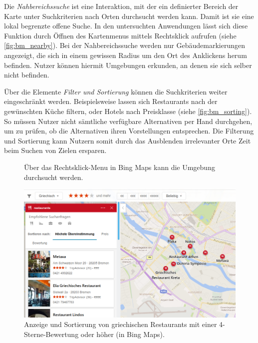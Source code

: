 Die \emph{Nahbereichssuche} ist eine Interaktion, mit der ein definierter Bereich der Karte unter Suchkriterien nach Orten durchsucht werden kann.
Damit ist sie eine lokal begrenzte offene Suche.
In den untersuchten Anwendungen lässt sich diese Funktion durch Öffnen des Kartenmenus mittels Rechtsklick aufrufen (siehe \autoref{fig:bm_nearby}).
Bei der Nahbereichssuche werden nur Gebäudemarkierungen angezeigt, die sich in einem gewissen Radius um den Ort des Anklickens herum befinden.
Nutzer können hiermit Umgebungen erkunden, an denen sie sich selber nicht befinden.

Über die Elemente \emph{Filter und Sortierung} können die Suchkriterien weiter eingeschränkt werden.
Beispielsweise lassen sich Restaurants nach der gewünschten Küche filtern, oder Hotels nach Preisklasse (siehe \autoref{fig:bm_sorting}).
So müssen Nutzer nicht sämtliche verfügbare Alternativen per Hand durchgehen, um zu prüfen, ob die Alternativen ihren Vorstellungen entsprechen.
Die Filterung und Sortierung kann Nutzern somit durch das Ausblenden irrelevanter Orte Zeit beim Suchen von Zielen ersparen.

\begin{figure}[p]
    \centering
	\caption{Über das Rechtsklick-Menu in Bing Maps kann die Umgebung durchsucht werden.}
	\label{fig:bm_nearby}
\end{figure}
\begin{figure}[p]
	\includegraphics[width=\linewidth]{figures/map-app_examples/bm_filter_sorting}
	\caption{Anzeige und Sortierung von griechischen Restaurants mit einer 4-Sterne-Bewertung oder höher (in Bing Maps).}
	\label{fig:bm_sorting}
\end{figure}

